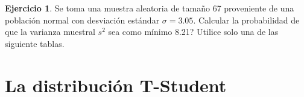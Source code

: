 \documentclass[
  11pt,
]{book}
\theoremstyle{definition}
\theoremstyle{definition}
\theoremstyle{definition}
\newtheorem{exercise}{Ejercicio}[chapter]
\theoremstyle{definition}
\theoremstyle{remark}
\begin{document}
\begin{exercise}

Se toma una muestra aleatoria de tamaño 67 proveniente de una población normal con desviación estándar \(\sigma =3.05\). Calcular la probabilidad de que la varianza muestral \(s^{2}\) sea como mínimo 8.21? Utilice solo una de las siguiente tablas.

\begin{minipage}{.45\textwidth} \centering \begin{table}[H]
\centering
\caption{\label{tab:unnamed-chunk-71}Distribución Ji-Cuadrado, df = 66}
\centering
{}
\end{table} \end{minipage}
      \begin{minipage}{.45\textwidth} \centering \begin{table}[H]
\centering
\caption{\label{tab:unnamed-chunk-72}Distribución Ji-Cuadrado, df = 65}
\centering
{}
\end{table} \end{minipage}

\end{exercise}

\section{La distribución T-Student}\label{la-distribuciuxf3n-t-student}
\end{document}
